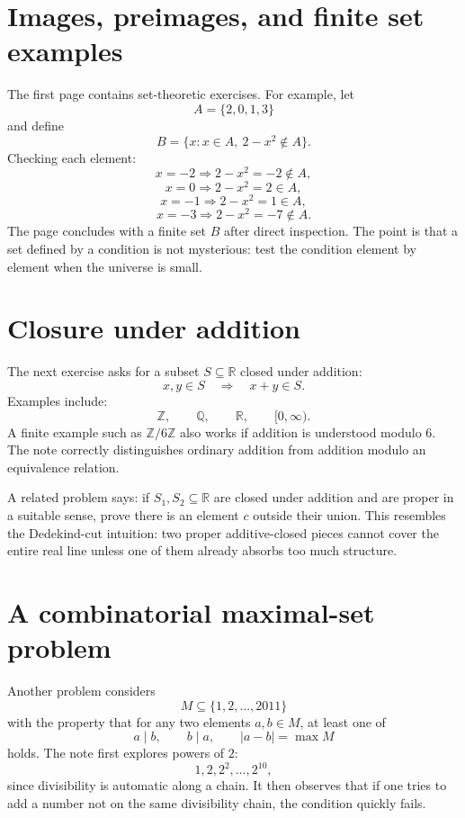 
\section{Images, preimages, and finite set examples}

The first page contains set-theoretic exercises.  For example, let
\[
  A=\{2,0,1,3\}
\]
and define
\[
  B=\{x:x\in A,\ 2-x^2\notin A\}.
\]
Checking each element:
\[
  x=-2\Rightarrow 2-x^2=-2\notin A,
\]
\[
  x=0\Rightarrow 2-x^2=2\in A,
\]
\[
  x=-1\Rightarrow 2-x^2=1\in A,
\]
\[
  x=-3\Rightarrow 2-x^2=-7\notin A.
\]
The page concludes with a finite set \(B\) after direct inspection.  The point is that a set defined by a condition is not mysterious: test the condition element by element when the universe is small.

\section{Closure under addition}

The next exercise asks for a subset \(S\subseteq\mathbb R\) closed under addition:
\[
  x,y\in S\quad\Rightarrow\quad x+y\in S.
\]
Examples include:
\[
  \mathbb Z,\qquad \mathbb Q,\qquad \mathbb R,\qquad [0,\infty).
\]
A finite example such as \(\mathbb Z/6\mathbb Z\) also works if addition is understood modulo \(6\).  The note correctly distinguishes ordinary addition from addition modulo an equivalence relation.

A related problem says: if \(S_1,S_2\subseteq\mathbb R\) are closed under addition and are proper in a suitable sense, prove there is an element \(c\) outside their union.  This resembles the Dedekind-cut intuition: two proper additive-closed pieces cannot cover the entire real line unless one of them already absorbs too much structure.

\section{A combinatorial maximal-set problem}

Another problem considers
\[
  M\subseteq\{1,2,\ldots,2011\}
\]
with the property that for any two elements \(a,b\in M\), at least one of
\[
  a\mid b,\qquad b\mid a,\qquad |a-b|=\max M
\]
holds.  The note first explores powers of \(2\):
\[
  1,2,2^2,\ldots,2^{10},
\]
since divisibility is automatic along a chain.  It then observes that if one tries to add a number not on the same divisibility chain, the condition quickly fails.

